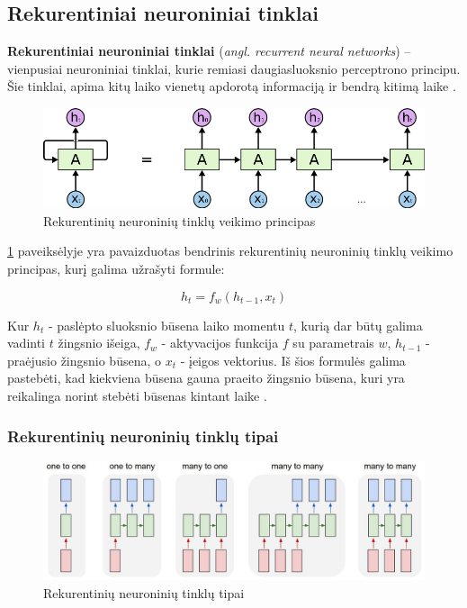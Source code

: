\documentclass{VUMIFPSbakalaurinis}
\begin{document}
\subsection{Rekurentiniai neuroniniai tinklai}

\textbf{Rekurentiniai neuroniniai tinklai} (\textit{angl. recurrent neural networks}) – vienpusiai neuroniniai tinklai, kurie remiasi daugiasluoksnio perceptrono principu. Šie tinklai, apima kitų laiko vienetų apdorotą informaciją ir bendrą kitimą laike \cite{DBLP:journals/corr/Lipton15}.


\begin{figure}[H]
	\centering
	\includegraphics[scale=0.4]{img/rnn}
	\caption[]{Rekurentinių neuroninių tinklų veikimo principas\footnotemark}
	\label{img:RNT}
\end{figure}

\ref{img:RNT} paveiksėlyje yra pavaizduotas bendrinis rekurentinių neuroninių tinklų veikimo principas, kurį galima užrašyti formule:

\begin{equation}\label{eq:RNT}
h_t = f_w(h_{t-1}, x_t)
\end{equation}

Kur $h_t$ - paslėpto sluoksnio būsena laiko momentu $t$, kurią dar būtų galima vadinti $t$ žingsnio išeiga, $f_w$ - aktyvacijos funkcija $f$ su parametrais $w$, $h_{t-1}$ - praėjusio žingsnio būsena, o $x_t$ - įeigos vektorius. Iš šios formulės galima pastebėti, kad kiekviena būsena gauna praeito žingsnio būsena, kuri yra reikalinga norint stebėti būsenas kintant laike	.


\subsubsection{Rekurentinių neuroninių tinklų tipai}

\begin{figure}[H]
	\centering
	\includegraphics[scale=0.3]{img/nn-tipai}
	\caption[]{Rekurentinių neuroninių tinklų tipai\footnotemark}
	\label{img:tipai}
\end{figure}
\end{document}
